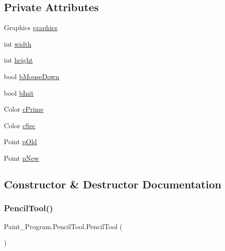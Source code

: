 \subsection*{Private Attributes}
\begin{DoxyCompactItemize}
\item 
Graphics \mbox{\hyperlink{class_paint___program_1_1_pencil_tool_ab4fb02c2a33bb96d80af3577ca0cfd65}{graphics}}
\item 
int \mbox{\hyperlink{class_paint___program_1_1_pencil_tool_a73493b4b2075f1c675e8eef6e93a39b0}{width}}
\item 
int \mbox{\hyperlink{class_paint___program_1_1_pencil_tool_ae874b99d7cbf60f10803057761873a0e}{height}}
\item 
bool \mbox{\hyperlink{class_paint___program_1_1_pencil_tool_aa4d253416a09bb60caa034b30aa4b178}{b\+Mouse\+Down}}
\item 
bool \mbox{\hyperlink{class_paint___program_1_1_pencil_tool_aa1ceafc9691b146393d86f6f10f4ac50}{b\+Init}}
\item 
Color \mbox{\hyperlink{class_paint___program_1_1_pencil_tool_acd091ded90e4b4e38afe9c730833a021}{c\+Prime}}
\item 
Color \mbox{\hyperlink{class_paint___program_1_1_pencil_tool_a47ee957e8b68e0db3b16acdb7705d185}{c\+Sec}}
\item 
Point \mbox{\hyperlink{class_paint___program_1_1_pencil_tool_ae8087fddbcaec028ff037c4e1d07ece2}{p\+Old}}
\item 
Point \mbox{\hyperlink{class_paint___program_1_1_pencil_tool_a8313fd420ea05ece228551d9d5d15c4d}{p\+New}}
\end{DoxyCompactItemize}


\subsection{Constructor \& Destructor Documentation}
\mbox{\label{class_paint___program_1_1_pencil_tool_a73363f013795c8814ebf9b297ea9be29}} 
\subsubsection{\texorpdfstring{Pencil\+Tool()}{PencilTool()}}
{\footnotesize\ttfamily Paint\+\_\+\+Program.\+Pencil\+Tool.\+Pencil\+Tool (\begin{DoxyParamCaption}{ }\end{DoxyParamCaption})\hspace{0.3cm}{\ttfamily [inline]}}



